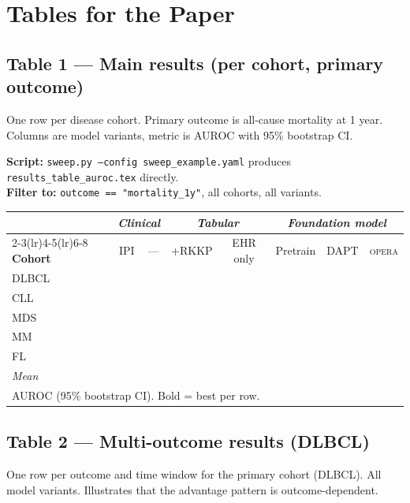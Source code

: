 \documentclass[11pt, a4paper]{article}
\newcommand{\op}{\textsc{opera}}
\newcommand{\code}[1]{\texttt{\small #1}}
\begin{document}
\section{Tables for the Paper}

\subsection{Table 1 — Main results (per cohort, primary outcome)}

One row per disease cohort. Primary outcome is all-cause mortality at
1 year. Columns are model variants, metric is AUROC with 95\% bootstrap CI.

\medskip
\begin{tcolorbox}[notebox]
  \textbf{Script:} \code{sweep.py --config sweep\_example.yaml}
  produces \code{results\_table\_auroc.tex} directly. \\
  \textbf{Filter to:} \code{outcome == "mortality\_1y"}, all cohorts, all variants.
\end{tcolorbox}

\medskip
\begin{center}
\begin{tabular}{lccccccc}
  \toprule
  & \multicolumn{2}{c}{\textit{Clinical}} & \multicolumn{2}{c}{\textit{Tabular}} & \multicolumn{3}{c}{\textit{Foundation model}} \\
  \cmidrule(lr){2-3}\cmidrule(lr){4-5}\cmidrule(lr){6-8}
  \textbf{Cohort} & IPI & — & +RKKP & EHR only & Pretrain & DAPT & \op \\
  \midrule
  DLBCL  & & & & & & & \\
  CLL    & & & & & & & \\
  MDS    & & & & & & & \\
  MM     & & & & & & & \\
  FL     & & & & & & & \\
  \midrule
  \textit{Mean} & & & & & & & \\
  \bottomrule
  \multicolumn{8}{l}{\small AUROC (95\% bootstrap CI). Bold = best per row.}
\end{tabular}
\end{center}

\subsection{Table 2 — Multi-outcome results (DLBCL)}

One row per outcome and time window for the primary cohort (DLBCL).
All model variants. Illustrates that the advantage pattern is
outcome-dependent.
\end{document}
